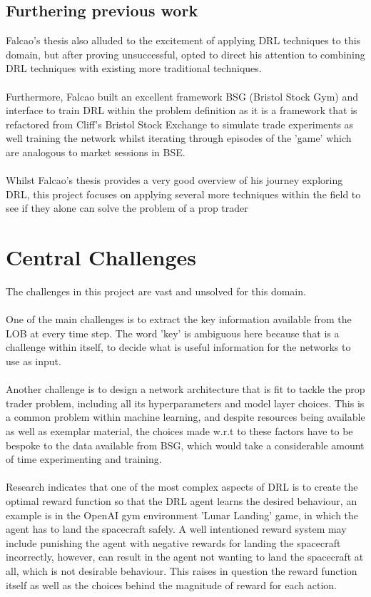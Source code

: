 \documentclass[ %
                    author={Ashwinder Khurana},
                supervisor={Prof Dave Cliff},
                    degree={MEng},
                     title={The Deeply Reinforced Trader},
                  subtitle={},
                      type={enterprise},
                      year={2020} ]{dissertation}
\begin{document}
\subsection{Furthering previous work}
\vspace{0.5cm}
Falcao's thesis \cite{falcao} also alluded to the excitement of applying DRL techniques to this domain, but after proving unsuccessful, opted to direct his attention to combining DRL techniques with existing more traditional techniques. 
\\
\\
Furthermore, Falcao built an excellent framework BSG (Bristol Stock Gym) and interface to train DRL within the problem definition as it is a framework that is refactored from Cliff's Bristol Stock Exchange to simulate trade experiments as well training the network whilst iterating through episodes of the 'game' which are analogous to market sessions in BSE.
\\
\\
Whilst Falcao's thesis provides a very good overview of his journey exploring DRL, this project focuses on applying several more techniques within the field to see if they alone can solve the problem of a prop trader

\vspace{0.5cm}
\section{Central Challenges}
\vspace{0.5cm} 

The challenges in this project are vast and unsolved for this domain. 
\\
\\
One of the main challenges is to extract the key information available from the LOB at every time step. The word 'key' is ambiguous here because that is a challenge within itself, to decide what is useful information for the networks to use as input. 
\\
\\
Another challenge is to design a network architecture that is fit to tackle the prop trader problem, including all its hyperparameters and model layer choices. This is a common problem within machine learning, and despite resources being available as well as exemplar material, the choices made w.r.t to these factors have to be bespoke to the data available from BSG, which would take a considerable amount of time experimenting and training. 
\\
\\
Research indicates that one of the most complex aspects of DRL is to create the optimal reward function so that the DRL agent learns the desired behaviour, an example is in the OpenAI gym environment 'Lunar Landing' game, in which the agent has to land the spacecraft safely. A well intentioned reward system may include punishing the agent with negative rewards for landing the spacecraft incorrectly, however, can result in the agent not wanting to land the spacecraft at all, which is not desirable behaviour. This raises in question the reward function itself as well as the choices behind the magnitude of reward for each action. 
\end{document}

